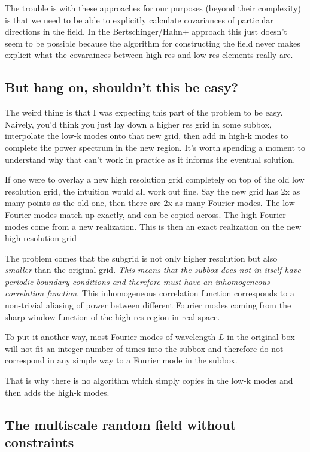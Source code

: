 \documentclass[11pt,a4paper,preprint]{aastex}
\begin{document}
The trouble is with these approaches for our purposes (beyond their
complexity) is that we need to be able to explicitly calculate
covariances of particular directions in the field. In the
Bertschinger/Hahn+ approach this just doesn't seem to be possible
because the algorithm for constructing the field never makes explicit
what the covarainces between high res and low res elements really
are.

\subsection{But hang on, shouldn't this be easy?}

The weird thing is that I was expecting this part of the problem to be
easy. Naively, you'd think you just lay down a higher res grid in some
subbox, interpolate the low-k modes onto that new grid, then add in
high-k modes to complete the power spectrum in the new region. It's
worth spending a moment to understand why that can't work in practice
as it informs the eventual solution.

If one were to overlay a new high resolution grid completely on top of
the old low resolution grid, the intuition would all work out
fine. Say the new grid has 2x as many points as the old one, then
there are 2x as many Fourier modes. The low Fourier modes match up
exactly, and can be copied across. The high Fourier modes come from a
new realization.  This is then an exact realization on the new
high-resolution grid

The problem comes that the subgrid is not only higher resolution but
also {\it smaller} than the original grid. {\it This means that
  the subbox does not in itself have periodic boundary conditions and
  therefore must have an inhomogeneous correlation function}. This
inhomogeneous correlation function corresponds to a non-trivial
aliasing of power between different Fourier modes coming from the
sharp window function of the high-res region in real space.

To put it another way, most Fourier modes of wavelength $L$ in the
original box will not fit an integer number of times into the subbox
and therefore do not correspond in any simple way to a Fourier mode in the
subbox.

That is why there is no algorithm which simply copies in the low-k
modes and then adds the high-k modes.

\subsection{The multiscale random field without constraints}
\end{document}
